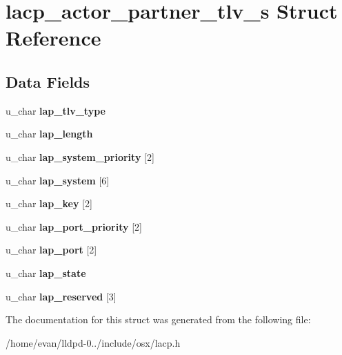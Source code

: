 \section{lacp\-\_\-actor\-\_\-partner\-\_\-tlv\-\_\-s \-Struct \-Reference}
\label{structlacp__actor__partner__tlv__s}
\subsection*{\-Data \-Fields}
\begin{DoxyCompactItemize}
\item 
u\-\_\-char {\bfseries lap\-\_\-tlv\-\_\-type}\label{structlacp__actor__partner__tlv__s_ab1d4a05949e10a886d72024721d1687a}

\item 
u\-\_\-char {\bfseries lap\-\_\-length}\label{structlacp__actor__partner__tlv__s_a36d5515ba4f69ee63db7d45db04ce700}

\item 
u\-\_\-char {\bfseries lap\-\_\-system\-\_\-priority} [2]\label{structlacp__actor__partner__tlv__s_a5592363ab03d9ada2246f752e1be32d1}

\item 
u\-\_\-char {\bfseries lap\-\_\-system} [6]\label{structlacp__actor__partner__tlv__s_a9cacdedc741afa785fbc2361779aafe8}

\item 
u\-\_\-char {\bfseries lap\-\_\-key} [2]\label{structlacp__actor__partner__tlv__s_ac4bd6d01c5a2233c52dbef5834330887}

\item 
u\-\_\-char {\bfseries lap\-\_\-port\-\_\-priority} [2]\label{structlacp__actor__partner__tlv__s_ab4a22de318db35534d95213c10f329c2}

\item 
u\-\_\-char {\bfseries lap\-\_\-port} [2]\label{structlacp__actor__partner__tlv__s_ad78b5a30fe4eac6289813cdf110b5329}

\item 
u\-\_\-char {\bfseries lap\-\_\-state}\label{structlacp__actor__partner__tlv__s_ab7b8dec4c6c1b94005a08b1e8da9415b}

\item 
u\-\_\-char {\bfseries lap\-\_\-reserved} [3]\label{structlacp__actor__partner__tlv__s_a62b4ac45fe51560ffec1b8ea1cfabf32}

\end{DoxyCompactItemize}


\-The documentation for this struct was generated from the following file\-:\begin{DoxyCompactItemize}
\item 
/home/evan/lldpd-\/0../include/osx/lacp.\-h\end{DoxyCompactItemize}
